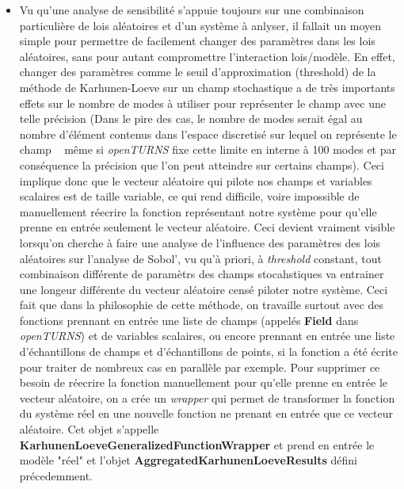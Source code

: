 \documentclass[a4paper,10pt]{article}
\begin{document}
\begin{itemize}
  \item Vu qu'une analyse de sensibilité s'appuie toujours sur une combinaison particulière de lois aléatoires et d'un système à anlyser, il fallait un moyen simple pour permettre de facilement changer des paramètres dans les lois aléatoires, sans pour autant compromettre l'interaction lois/modèle. En effet, changer des paramètres comme le seuil d'approximation (threshold) de la méthode de Karhunen-Loeve sur un champ stochastique a de très importants effets sur le nombre de modes à utiliser pour représenter le champ avec une telle précision (Dans le pire des cas, le nombre de modes serait égal au nombre d'élément contenus dans l'espace discretisé sur lequel on représente le champ ~ même si \textit{openTURNS} fixe cette limite en interne à 100 modes et par conséquence la précision que l'on peut atteindre sur certains champs). Ceci implique donc que le vecteur aléatoire qui pilote nos champs et variables scalaires est de taille variable, ce qui rend difficile, voire impossible de manuellement réecrire la fonction représentant notre système pour qu'elle prenne en entrée seulement le vecteur aléatoire. Ceci devient vraiment visible lorsqu'on cherche à faire une analyse de l'influence des paramètres des lois aléatoires sur l'analyse de Sobol', vu qu'à priori, à \textit{threshold} constant, tout combinaison différente de paramètrs des champs stocahstiques va entrainer une longeur différente du vecteur aléatoire censé piloter notre système. 
  Ceci fait que dans la philosophie de cette méthode, on travaille surtout avec des fonctions prennant en entrée une liste de champs (appelés \textbf{Field} dans \textit{openTURNS}) et de variables scalaires, ou encore prennant en entrée une liste d'échantillons de champs et d'échantillons de points, si la fonction a été écrite pour traiter de nombreux cas en parallèle par exemple.
  Pour supprimer ce besoin de réecrire la fonction manuellement pour qu'elle prenne en entrée le vecteur aléatoire, on a crée un \textit{wrapper} qui permet de transformer la fonction du système réel en une nouvelle fonction ne prenant en entrée que ce vecteur aléatoire. Cet objet s'appelle \textbf{KarhunenLoeveGeneralizedFunctionWrapper} et prend en entrée le modèle "réel" et l'objet \textbf{AggregatedKarhunenLoeveResults} défini précedemment. 
  
  
  
  
  
  
  
   

\end{itemize}
\end{document}
